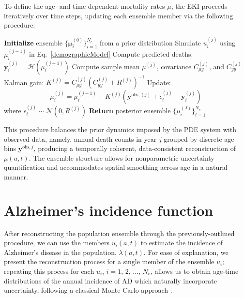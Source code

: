 \documentclass{article}
\begin{document}
\par To define the age- and time-dependent mortality rates $\mu$, the EKI proceeds iteratively over time steps, updating each ensemble member via the following procedure:
\begin{algorithm}[H]
\caption{EKI for Mortality Estimation}
\begin{algorithmic}[1]
\State \textbf{Initialize} ensemble $\{ \boldsymbol{\mu}_i^{(0)} \}_{i=1}^{N_e}$ from a prior distribution
        \State Simulate $u_i^{(j)}$ using $\mu_i^{(j-1)}$ in Eq.~\eqref{demographicModel}
        \State Compute predicted deaths: $\mathbf{y}_i^{(j)} = \mathcal{H}(\mu_i^{(j-1)})$
    \EndFor
    \State Compute sample mean $\bar{\mu}^{(j)}$, covariance $C_{\mu y}^{(j)}$, and $C_{yy}^{(j)}$
    \State Kalman gain: $K^{(j)} = C_{\mu y}^{(j)} \left(C_{yy}^{(j)} + R^{(j)}\right)^{-1}$
        \State Update:
        \[
        \mu_i^{(j)} = \mu_i^{(j-1)} + K^{(j)} \left( \mathbf{y}^{\text{obs},(j)} + \epsilon_i^{(j)} - \mathbf{y}_i^{(j)} \right)
        \]
        where $\epsilon_i^{(j)} \sim \mathcal{N}(0, R^{(j)})$
    \EndFor
\EndFor
\State \textbf{Return} posterior ensemble $\{ \mu_i^{(J)} \}_{i=1}^{N_e}$
\end{algorithmic}
\end{algorithm}

\par This procedure balances the prior dynamics imposed by the PDE system with observed data, namely, annual death counts in year $j$ grouped by discrete age-bins $\mathbf{y}^{\text{obs},j}$,  producing a temporally coherent, data-consistent reconstruction of $\mu(a,t)$. The ensemble structure allows for nonparametric uncertainty quantification and accommodates spatial smoothing across age in a natural manner. 



\section{Alzheimer's incidence function}\label{sec:incidence}

After reconstructing the population ensemble through the previously-outlined procedure, we can use the members $u_i(a,t)$ to estimate the incidence of Alzheimer's disease in the population, $\lambda(a,t)$. For ease of explanation, we present the reconstruction process for a single member of the ensemble $u_i$; repeating this process for each $u_i$, $i=1,\,2,\,...,\,N_e$, allows us to obtain age-time distributions of the annual incidence of AD which naturally incorporate uncertainty, following a classical Monte Carlo approach \cite{caflisch1998}.
\end{document}
